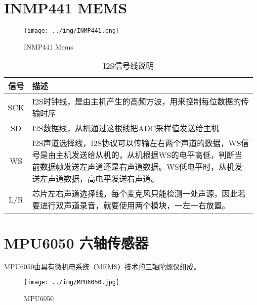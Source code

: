 \section{INMP441 MEMS}

\begin{figure} [H]
    \centering
    \texttt{[image: ../img/INMP441.png]}
    \caption{INMP441 Mems}
\end{figure}

\begin{table} [H]
    \centering
    \begin{tabular}{|c|p{15cm}|}
        \hline
        \textbf{信号} & \textbf{描述}                                                                                           \\ \hline
        SCK         & I2S时钟线，是由主机产生的高频方波，用来控制每位数据的传输时序                                                                      \\ \hline
        SD          & I2S数据线，从机通过这根线把ADC采样值发送给主机                                                                            \\ \hline
        WS          & I2S声道选择线，I2S协议可以传输左右两个声道的数据，WS信号是由主机发送给从机的，从机根据WS的电平高低，判断当前数据帧发送左声道还是右声道数据。WS低电平时，从机发送左声道数据，高电平发送右声道。 \\ \hline
        L/R         & 芯片左右声道选择线，每个麦克风只能检测一处声源，因此若要进行双声道录音，就要使用两个模块，一左一右放置。                                                  \\ \hline
    \end{tabular}
    \caption{I2S信号线说明}
\end{table}

\section{MPU6050 六轴传感器}

MPU6050由具有微机电系统（MEMS）技术的三轴陀螺仪组成。

\begin{figure} [H]
    \centering
    \texttt{[image: ../img/MPU6050.jpg]}
    \caption{MPU6050}
\end{figure}


